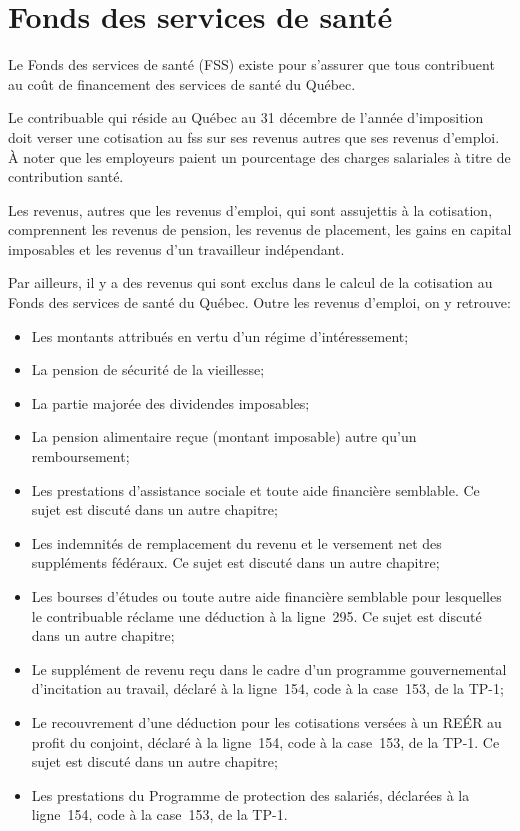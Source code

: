 \section{Fonds des services de santé}
\begin{intro}
	Le Fonds des services de santé (FSS) existe pour s'assurer que tous contribuent au coût de financement des services de santé du Québec.
\end{intro}
Le contribuable qui réside au Québec au 31 décembre de l'année d'imposition doit verser une cotisation au \acrfull{fss} sur ses revenus autres que ses revenus d'emploi. À noter que les employeurs paient un pourcentage des charges salariales à titre de contribution santé.

Les revenus, autres que les revenus d'emploi, qui sont assujettis à la cotisation, comprennent les revenus de pension, les revenus de placement, les gains en capital imposables et les revenus d'un travailleur indépendant.

Par ailleurs, il y a des revenus qui sont exclus dans le calcul de la cotisation au Fonds des services de santé du Québec. Outre les revenus d'emploi, on y retrouve:
\begin{itemize}
	\item Les montants attribués en vertu d'un régime d'intéressement;
	\item La pension de sécurité de la vieillesse;
	\item La partie majorée des dividendes imposables;
	\item La pension alimentaire reçue (montant imposable) autre qu'un remboursement;
	\item Les prestations d'assistance sociale et toute aide financière semblable. Ce sujet est discuté dans un autre chapitre;
	\item Les indemnités de remplacement du revenu et le versement net des suppléments fédéraux. Ce sujet est discuté dans un autre chapitre;
	\item Les bourses d'études ou toute autre aide financière semblable pour lesquelles le contribuable réclame une déduction à la ligne~295. Ce sujet est discuté dans un autre chapitre;
	\item Le supplément de revenu reçu dans le cadre d'un programme gouvernemental d'incitation au travail, déclaré à la ligne~154, code  \fg{} à la case~153, de la TP-1;
	\item Le recouvrement d'une déduction pour les cotisations versées à un REÉR au profit du conjoint, déclaré à la ligne~154, code  \fg{} à la case~153, de la TP-1. Ce sujet est discuté dans un autre chapitre;
	\item Les prestations du Programme de protection des salariés, déclarées à la ligne~154, code  \fg{} à la case~153, de la TP-1.
\end{itemize}

